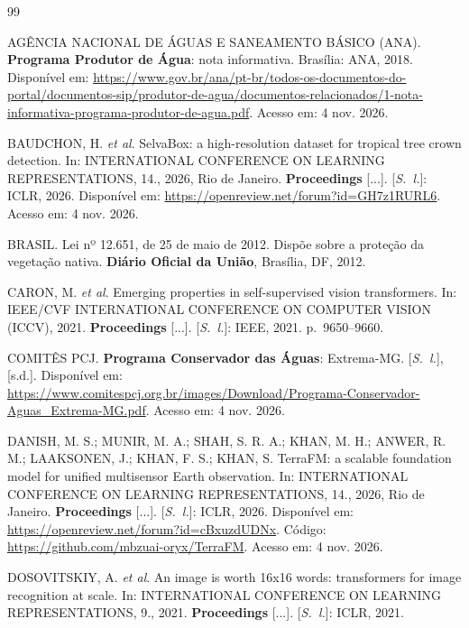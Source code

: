 \documentclass[conference]{IEEEtran}
\begin{document}
\renewcommand{\refname}{Referências}
\begin{thebibliography}{99}
\footnotesize

 AGÊNCIA NACIONAL DE ÁGUAS E SANEAMENTO BÁSICO (ANA). \textbf{Programa Produtor de Água}: nota informativa. Brasília: ANA, 2018. Disponível em: \url{https://www.gov.br/ana/pt-br/todos-os-documentos-do-portal/documentos-sip/produtor-de-agua/documentos-relacionados/1-nota-informativa-programa-produtor-de-agua.pdf}. Acesso em: 4 nov. 2026.

 BAUDCHON, H. \textit{et al}. SelvaBox: a high-resolution dataset for tropical tree crown detection. In: INTERNATIONAL CONFERENCE ON LEARNING REPRESENTATIONS, 14., 2026, Rio de Janeiro. \textbf{Proceedings} [...]. [\textit{S.~l.}]: ICLR, 2026. Disponível em: \url{https://openreview.net/forum?id=GH7z1RURL6}. Acesso em: 4 nov. 2026.

 BRASIL. Lei nº 12.651, de 25 de maio de 2012. Dispõe sobre a proteção da vegetação nativa. \textbf{Diário Oficial da União}, Brasília, DF, 2012.

 CARON, M. \textit{et al}. Emerging properties in self-supervised vision transformers. In: IEEE/CVF INTERNATIONAL CONFERENCE ON COMPUTER VISION (ICCV), 2021. \textbf{Proceedings} [...]. [\textit{S.~l.}]: IEEE, 2021. p.~9650--9660.

 COMITÊS PCJ. \textbf{Programa Conservador das Águas}: Extrema-MG. [\textit{S.~l.}], [s.d.]. Disponível em: \url{https://www.comitespcj.org.br/images/Download/Programa-Conservador-Aguas_Extrema-MG.pdf}. Acesso em: 4 nov. 2026.

 DANISH, M. S.; MUNIR, M. A.; SHAH, S. R. A.; KHAN, M. H.; ANWER, R. M.; LAAKSONEN, J.; KHAN, F. S.; KHAN, S. TerraFM: a scalable foundation model for unified multisensor Earth observation. In: INTERNATIONAL CONFERENCE ON LEARNING REPRESENTATIONS, 14., 2026, Rio de Janeiro. \textbf{Proceedings} [...]. [\textit{S.~l.}]: ICLR, 2026. Disponível em: \url{https://openreview.net/forum?id=cBxuzdUDNx}. Código: \url{https://github.com/mbzuai-oryx/TerraFM}. Acesso em: 4 nov. 2026.

 DOSOVITSKIY, A. \textit{et al}. An image is worth 16x16 words: transformers for image recognition at scale. In: INTERNATIONAL CONFERENCE ON LEARNING REPRESENTATIONS, 9., 2021. \textbf{Proceedings} [...]. [\textit{S.~l.}]: ICLR, 2021.


\end{thebibliography}
\end{document}
